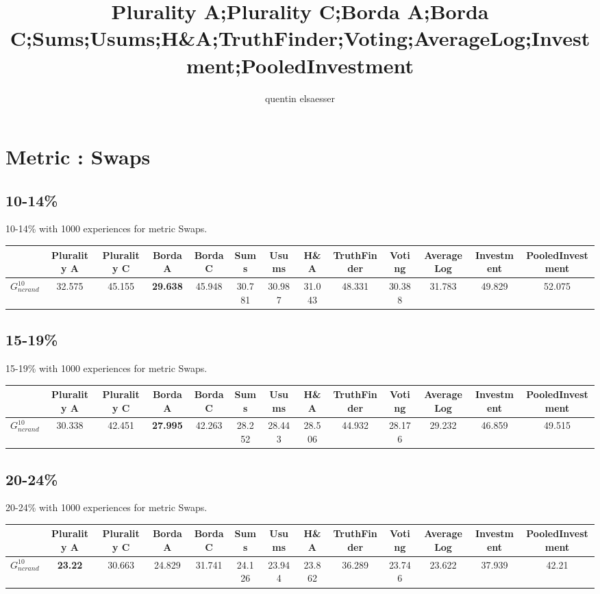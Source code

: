 \documentclass{article}
\author{quentin elsaesser}
\title{Plurality A;Plurality C;Borda A;Borda C;Sums;Usums;H\&A;TruthFinder;Voting;AverageLog;Investment;PooledInvestment}
\newcommand{\graph}[2]{$G_{#1}^{#2}$}
\begin{document}
\newpage

\newpage
\section{Metric : Swaps}

\newpage

\subsection{10-14\%}

10-14\% with 1000 experiences for metric Swaps.

\noindent\begin{tabular}{|l|c|c|c|c|c|c|c|c|c|c|c|c|}
\hline
& Plurality A& Plurality C& Borda A& Borda C& Sums& Usums& H\&A& TruthFinder& Voting& AverageLog& Investment& PooledInvestment\\
\hline
\graph{ncrand}{10} &32.575&45.155&\textbf{29.638}&45.948&30.781&30.987&31.043&48.331&30.388&31.783&49.829&52.075\\
\hline
\end{tabular}
\newpage

\subsection{15-19\%}

15-19\% with 1000 experiences for metric Swaps.

\noindent\begin{tabular}{|l|c|c|c|c|c|c|c|c|c|c|c|c|}
\hline
& Plurality A& Plurality C& Borda A& Borda C& Sums& Usums& H\&A& TruthFinder& Voting& AverageLog& Investment& PooledInvestment\\
\hline
\graph{ncrand}{10} &30.338&42.451&\textbf{27.995}&42.263&28.252&28.443&28.506&44.932&28.176&29.232&46.859&49.515\\
\hline
\end{tabular}
\newpage

\subsection{20-24\%}

20-24\% with 1000 experiences for metric Swaps.

\noindent\begin{tabular}{|l|c|c|c|c|c|c|c|c|c|c|c|c|}
\hline
& Plurality A& Plurality C& Borda A& Borda C& Sums& Usums& H\&A& TruthFinder& Voting& AverageLog& Investment& PooledInvestment\\
\hline
\graph{ncrand}{10} &\textbf{23.22}&30.663&24.829&31.741&24.126&23.944&23.862&36.289&23.746&23.622&37.939&42.21\\
\hline
\end{tabular}
\newpage
\end{document}
